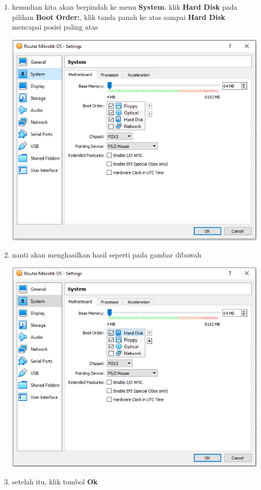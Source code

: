 \documentclass{article}
\begin{document}
\begin{flushleft}
\begin{enumerate}
			\item kemudian kita akan berpindah ke menu \textbf{System}. klik \textbf{Hard Disk} pada pilihan \textbf{Boot Order:}, klik tanda panah ke atas sampai \textbf{Hard Disk} mencapai posisi paling atas 
				\begin{center}
					\includegraphics[scale=0.6]{(e)}
				\end{center}
			
			\item nanti akan menghasilkan hasil seperti pada gambar dibawah 
				\begin{center}
					\includegraphics[scale=0.6]{(e)true}
				\end{center}
						
			\item setelah itu, klik tombol \textbf{Ok}
					        	
        	
        \end{enumerate}
		
    \end{flushleft}
\end{document}
